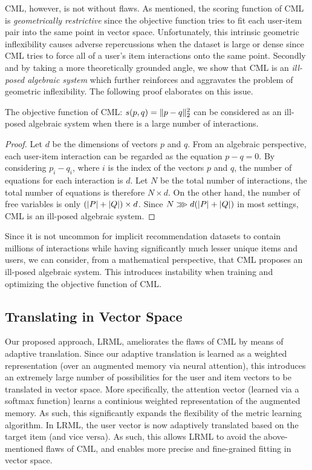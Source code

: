 \documentclass[sigconf]{acmart}
\DeclarePairedDelimiter{\abs}{\lvert}{\rvert}
\DeclarePairedDelimiter\norm{\lVert}{\rVert}
\begin{document}
CML, however, is not without flaws. As mentioned, the scoring function of CML is \textit{geometrically restrictive} since the objective function tries to fit each user-item pair into the same point in vector space. Unfortunately, this intrinsic geometric inflexibility causes adverse repercussions when the dataset is large or dense since CML tries to force all of a user's item interactions onto the same point. Secondly and by taking a more theoretically grounded angle, we show that CML is an \textit{ill-posed algebraic system} \cite{illposed} which further reinforces and aggravates the problem of geometric inflexibility. The following proof elaborates on this issue. 

\begin{theorem}
The objective function of CML: $s(p,q) = \norm{p-q}^{2}_{2}$ can be considered as an ill-posed algebraic system when there is a large number of interactions. 
\end{theorem}

\begin{proof}
Let $d$ be the dimensions of vectors $p$ and $q$. From an algebraic perspective, each user-item interaction can be regarded as the equation $p-q=0$. By considering $p_i - q_i$, where $i$ is the index of the vectors $p$ and $q$, the number of equations for each interaction is $d$. Let $N$ be the total number of interactions, the total number of equations is therefore $N \times d$. On the other hand, the number of free variables is only $(\abs{P} + \abs{Q}) \times d$. Since $N \ggg d(\abs{P} + \abs{Q})$ in most settings, 
CML is an ill-posed algebraic system. 
\end{proof}

 Since it is not uncommon for implicit recommendation datasets to contain millions of interactions while having significantly much lesser unique items and users, we can consider, from a mathematical perspective, that CML proposes an ill-posed algebraic system. This introduces instability when training and optimizing the objective function of CML. 

\subsection{Translating in Vector Space}


Our proposed approach, \textsc{LRML}, ameliorates the flaws of CML by means of adaptive translation. Since our adaptive translation is learned as a weighted representation (over an augmented memory via neural attention), this introduces an extremely large number of possibilities for the user and item vectors to be translated in vector space. More specifically, the attention vector (learned via a softmax function) learns a continious weighted representation of the augmented memory. As such, this significantly expands the flexibility of the metric learning algorithm. In LRML, the user vector is now adaptively translated based on the target item (and vice versa). As such, this allows \textsc{LRML} to avoid the above-mentioned flaws of CML, and enables more precise and fine-grained fitting in vector space. 
\end{document}
